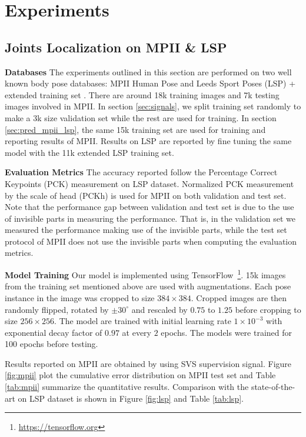 \section{Experiments}


\subsection{Joints Localization on MPII \& LSP}

\noindent\textbf{Databases} The experiments outlined in this section are performed on two well known body pose databases: MPII Human Pose \cite{andriluka20142d} and Leeds Sport Poses (LSP) + extended training set \cite{Johnson10}. There are around 18k training images and 7k testing images involved in MPII. In section \ref{sec:signals}, we split training set randomly to make a 3k size validation set while the rest are used for training. In section \ref{sec:pred_mpii_lsp}, the same 15k training set are used for training and reporting results of MPII. Results on LSP are reported by fine tuning the same model with the 11k extended LSP training set.

\noindent\textbf{Evaluation Metrics} The accuracy reported follow the Percentage Correct Keypoints (PCK) measurement on LSP dataset. Normalized PCK measurement by the scale of head (PCKh) is used for MPII on both validation and test set. Note that the performance gap between validation and test set is due to the use of invisible parts in measuring the performance. That is, in the validation set we measured the performance making use of the invisible parts, while the test set protocol of MPII does not use the invisible parts when computing the evaluation metrics.

\noindent\textbf{Model Training} Our model is implemented using TensorFlow~\footnote{\url{https://tensorflow.org}}. 15k images from the training set mentioned above are used with augmentations. Each pose instance in the image was cropped to size $384 \times 384$. Cropped images are then randomly flipped, rotated by $\pm 30^{\circ} $ and rescaled by $0.75$ to $1.25$ before cropping to size $256 \times 256$. The model are trained with initial learning rate $1\times10^{-3}$ with exponential decay factor of $0.97$ at every $2$ epochs. The models were trained for 100 epochs before testing.

Results reported on MPII are obtained by using SVS supervision signal. Figure \ref{fig:mpii} plot the cumulative error distribution on MPII test set and Table \ref{tab:mpii} summarize the quantitative results. Comparison with the state-of-the-art on LSP dataset is shown in Figure \ref{fig:lsp} and Table \ref{tab:lsp}. 

